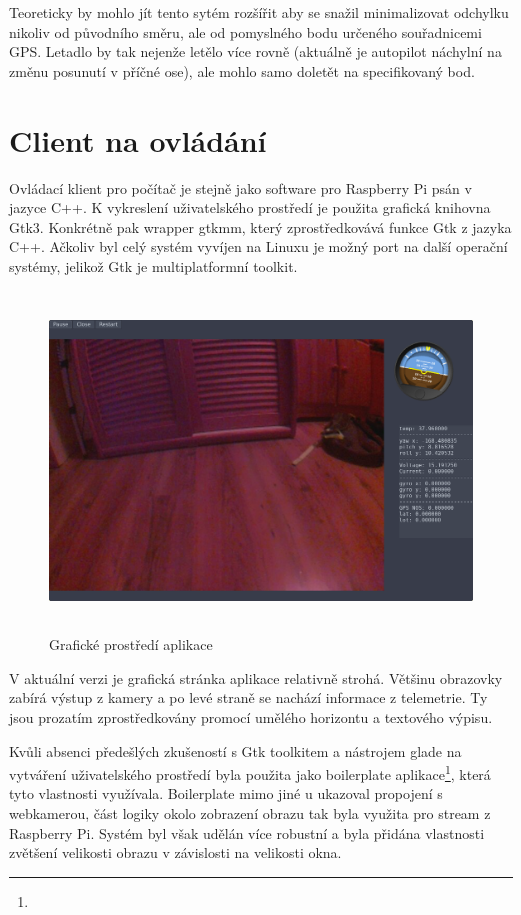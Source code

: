 \documentclass[a4paper,oneside,12pt]{report}
\begin{document}
Teoreticky by mohlo jít tento sytém rozšířit aby se snažil minimalizovat odchylku nikoliv od původního směru, ale od pomyslného bodu určeného souřadnicemi GPS.
Letadlo by tak nejenže letělo více rovně (aktuálně je autopilot náchylní na změnu posunutí v příčné ose), ale mohlo samo doletět na specifikovaný bod.


\chapter{Client na ovládání}

Ovládací klient pro počítač je stejně jako software pro Raspberry Pi psán v jazyce C++.
K vykreslení uživatelského prostředí je použita grafická knihovna Gtk3.
Konkrétně pak wrapper gtkmm, který zprostředkovává funkce Gtk z jazyka C++.
Ačkoliv byl celý systém vyvíjen na Linuxu je možný port na další operační systémy, jelikož Gtk je multiplatformní toolkit.

\begin{figure}[h]
  \centering
  \includegraphics[height=9cm]{../img/interface.png}
  \caption[Grafické prostředí aplikace]{Grafické prostředí aplikace}
\end{figure}

V aktuální verzi je grafická stránka aplikace relativně strohá.
Většinu obrazovky zabírá výstup z kamery a po levé straně se nachází informace z telemetrie.
Ty jsou prozatím zprostředkovány promocí umělého horizontu a textového výpisu.

Kvůli absenci předešlých zkušeností s Gtk toolkitem a nástrojem glade na vytváření uživatelského prostředí byla použita jako boilerplate aplikace\footnote{}, která tyto vlastnosti využívala.
Boilerplate mimo jiné u ukazoval propojení s webkamerou, část logiky okolo zobrazení obrazu tak byla využita pro stream z Raspberry Pi.
Systém byl však udělán více robustní a byla přidána vlastnosti zvětšení velikosti obrazu v závislosti na velikosti okna.
\end{document}
